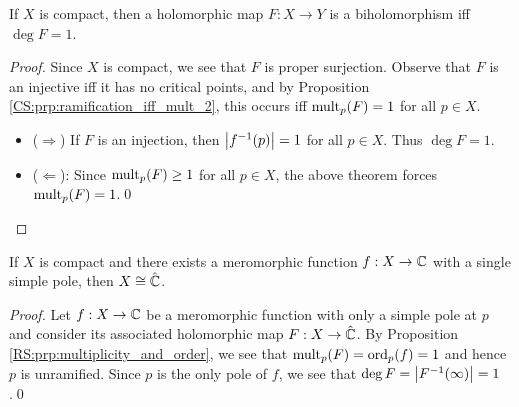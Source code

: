 \documentclass[../Moduli_Spaces_of_Riemann_Surfaces.tex]{subfiles}
\begin{document}
    \begin{corollary}
        If $X$ is compact, then a holomorphic map $F:X\to Y$ is a biholomorphism iff $\deg F=1$.
    \end{corollary}
    \begin{proof}
        Since $X$ is compact, we see that $F$ is proper surjection. Observe that $F$ is an injective iff it has no critical points, and by Proposition \ref{CS:prp:ramification_iff_mult_2}, this occurs iff $\operatorname{mult}_p\!\left(F\right)=1$ for all $p\in X$.
        \begin{itemize}
            \item ($\Rightarrow$) If $F$ is an injection, then $\left|f^{-1}\!\left(p\right)\right|=1$ for all $p\in X$. Thus $\deg F=1$.
            \item ($\Leftarrow$): Since $\operatorname{mult}_p\!\left(F\right)\geq1$ for all $p\in X$, the above theorem forces $\operatorname{mult}_p\!\left(F\right)=1$.\qed
        \end{itemize}
    \end{proof}
    \begin{corollary}\label{CS:cor:exists_meromorphic_implies_biholomorphic_Riemann_sphere}
        If $X$ is compact and there exists a meromorphic function $f:X\to\mathbb{C}$ with a single simple pole, then $X\cong\hat{\mathbb{C}}$.
    \end{corollary}
    \begin{proof}
        Let $f:X\to\mathbb{C}$ be a meromorphic function with only a simple pole at $p$ and consider its associated holomorphic map $F:X\to\hat{\mathbb{C}}$. By Proposition \ref{RS:prp:multiplicity_and_order}, we see that $\operatorname{mult}_p\!\left(F\right)=\operatorname{ord}_p\!\left(f\right)=1$ and hence $p$ is unramified. Since $p$ is the only pole of $f$, we see that $\deg F=\left|F^{-1}\!\left(\infty\right)\right|=1$.\qed
    \end{proof}
\end{document}
